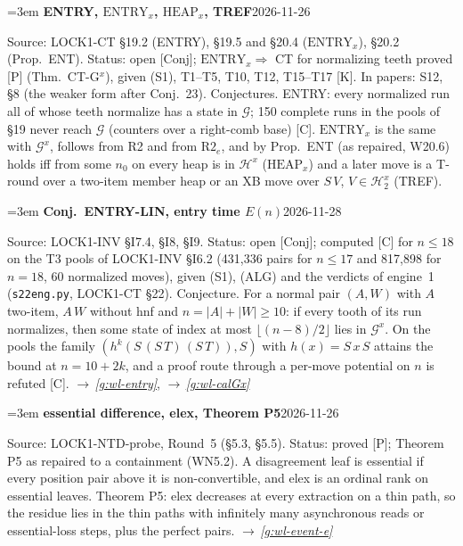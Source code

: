 \documentclass[11pt]{amsart}
\makeatletter
\newcommand{\sz}[1]{\lvert#1\rvert}
\newcommand{\Hc}{\mathcal H}
\newcommand{\Gc}{\mathcal G}
\newcounter{sense}
\newenvironment{entry}[3]{%
  \par\addvspace{\medskipamount}\noindent\phantomsection
  \def\@currentlabel{#2}\label{#1}\setcounter{sense}{0}\raggedright\emergencystretch=3em%
  \textbf{#2}\hfill{\footnotesize\textsf{#3}}\par\nopagebreak\noindent\ignorespaces}%
  {\par}
\newcommand{\src}[1]{\textsf{Source:} #1.\enskip}
\newcommand{\status}[1]{\textsf{Status:} #1.\enskip}
\newcommand{\appears}[1]{\textsf{In papers:} #1.\enskip}
\renewcommand{\see}[1]{$\rightarrow$\,\emph{\ref{#1}}}
\makeatother
\begin{document}
\begin{entry}{g:wl-entry}{ENTRY, $\mathrm{ENTRY}_x$, $\mathrm{HEAP}_x$, TREF}{2026-11-26}
\src{LOCK1-CT \S19.2 (ENTRY), \S19.5 and \S20.4 ($\mathrm{ENTRY}_x$), \S20.2 (Prop.~ENT)}
\status{open [Conj]; $\mathrm{ENTRY}_x\Rightarrow$ CT for normalizing teeth proved [P] (Thm.~CT-G$^{x}$),
given (S1), T1--T5, T10, T12, T15--T17 [K]}
\appears{S12, \S8 (the weaker form after Conj.~23)}
Conjectures. ENTRY: every normalized run all of whose teeth normalize has a state in $\Gc$; 150
complete runs in the pools of \S19 never reach $\Gc$ (counters over a right-comb base) [C].
$\mathrm{ENTRY}_x$ is the same with $\Gc^{x}$, follows from R2 and from $\mathrm{R2}_e$, and by Prop.~ENT (as repaired, W20.6)
holds iff from some $n_0$ on every heap is in $\Hc^{x}$ ($\mathrm{HEAP}_x$) and a later move is a
T-round over a two-item member heap or an XB move over $S\,V$, $V\in\Hc^{x}_2$ (TREF).
\end{entry}

\begin{entry}{g:wl-entry-lin}{Conj.~ENTRY-LIN, entry time $E(n)$}{2026-11-28}
\src{LOCK1-INV \S I7.4, \S I8, \S I9}
\status{open [Conj]; computed [C] for $n\le18$ on the T3 pools of LOCK1-INV \S I6.2 (431{,}336 pairs for
$n\le17$ and 817{,}898 for $n=18$, 60 normalized moves), given (S1), (ALG) and the verdicts of engine~1
(\texttt{s22eng.py}, LOCK1-CT \S22)}
Conjecture. For a normal pair $(A,W)$ with $A$ two-item, $A\,W$ without hnf and $n=\sz{A}+\sz{W}\ge10$: if every tooth of
its run normalizes, then some state of index at most $\lfloor(n-8)/2\rfloor$ lies in $\Gc^{x}$. On the pools the
family $(h^k(S\,(S\,T)\,(S\,T)),S)$ with $h(x)=S\,x\,S$ attains the bound at $n=10+2k$, and a proof route through a
per-move potential on $n$ is refuted [C]. \see{g:wl-entry}, \see{g:wl-calGx}
\end{entry}

\begin{entry}{g:wl-essential}{essential difference, elex, Theorem P5}{2026-11-26}
\src{LOCK1-NTD-probe, Round~5 (\S5.3, \S5.5)}
\status{proved [P]; Theorem P5 as repaired to a containment (WN5.2)}
A disagreement leaf is essential if every position pair above it is non-convertible, and elex is an
ordinal rank on essential leaves. Theorem P5: elex decreases at every extraction on a thin path, so
the residue lies in the thin paths with infinitely many asynchronous reads or essential-loss steps,
plus the perfect pairs. \see{g:wl-event-e}
\end{entry}
\end{document}
